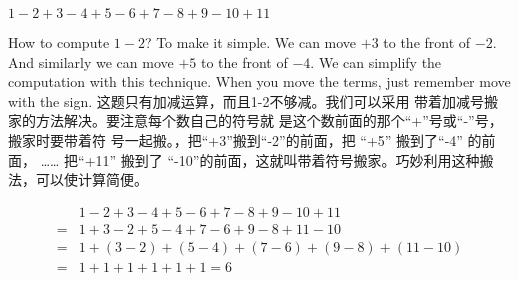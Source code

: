 \begin{example}
$1-2+3-4+5-6+7-8+9-10+11$
\end{example}
\begin{solution}
\begin{paracol}{2}
How to compute $1-2$? To make it simple. We can move $+3$ to the front of $-2$. And similarly we can move $+5$ to the front of $-4$. We can simplify the computation with this technique. When you move the terms, just remember move with the sign.
\switchcolumn[1]
这题只有加减运算，而且1-2不够减。我们可以采用
带着加减号搬家的方法解决。要注意每个数自己的符号就
是这个数前面的那个“+”号或“-”号，搬家时要带着符
号一起搬。，把“+3”搬到“-2”的前面，把
“+5” 搬到了“-4” 的前面， …… 把“+11” 搬到了
“-10”的前面，这就叫带着符号搬家。巧妙利用这种搬
法，可以使计算简便。
\end{paracol}
$$
\begin{aligned}
&1-2+3-4+5-6+7-8+9-10+11\\
=&1+3-2+5-4+7-6+9-8+11-10\\
=&1+(3-2)+(5-4)+(7-6)+(9-8)+(11-10)\\
=&1+1+1+1+1+1=6
\end{aligned}
$$
\end{solution}
   \newpage